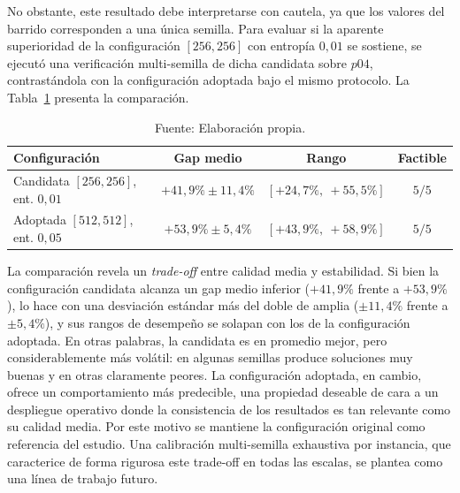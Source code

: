 No obstante, este resultado debe interpretarse con cautela, ya que los valores del barrido corresponden a una única semilla. Para evaluar si la aparente superioridad de la configuración $[256,256]$ con entropía $0{,}01$ se sostiene, se ejecutó una verificación multi-semilla de dicha candidata sobre $p04$, contrastándola con la configuración adoptada bajo el mismo protocolo. La Tabla~\ref{tab:multisemilla-p04} presenta la comparación.

\begin{table}[H]
    \centering
    \renewcommand{\arraystretch}{1.15}
    \setlength{\tabcolsep}{8pt}
    \begin{tabular}{@{}lccc@{}}
        \toprule
        \textbf{Configuración} & \textbf{Gap medio} & \textbf{Rango} & \textbf{Factible} \\
        \midrule
        Candidata $[256,256]$, ent. $0{,}01$ & $+41{,}9\% \pm 11{,}4\%$ & $[+24{,}7\%,\ +55{,}5\%]$ & $5/5$ \\
        Adoptada $[512,512]$, ent. $0{,}05$  & $+53{,}9\% \pm 5{,}4\%$  & $[+43{,}9\%,\ +58{,}9\%]$ & $5/5$ \\
        \bottomrule
    \end{tabular}
    \caption{\label{tab:multisemilla-p04} Comparación multi-semilla ($5$ semillas) sobre $p04$ entre la configuración candidata y la adoptada.}
    \caption*{Fuente: Elaboración propia.}
\end{table}

La comparación revela un \textit{trade-off} entre calidad media y estabilidad. Si bien la configuración candidata alcanza un gap medio inferior ($+41{,}9\%$ frente a $+53{,}9\%$), lo hace con una desviación estándar más del doble de amplia ($\pm 11{,}4\%$ frente a $\pm 5{,}4\%$), y sus rangos de desempeño se solapan con los de la configuración adoptada. En otras palabras, la candidata es en promedio mejor, pero considerablemente más volátil: en algunas semillas produce soluciones muy buenas y en otras claramente peores. La configuración adoptada, en cambio, ofrece un comportamiento más predecible, una propiedad deseable de cara a un despliegue operativo donde la consistencia de los resultados es tan relevante como su calidad media. Por este motivo se mantiene la configuración original como referencia del estudio. Una calibración multi-semilla exhaustiva por instancia, que caracterice de forma rigurosa este trade-off en todas las escalas, se plantea como una línea de trabajo futuro. %

